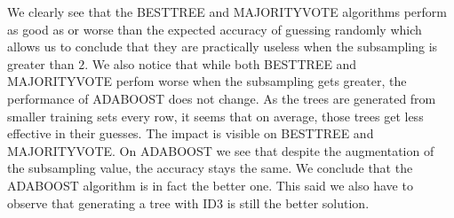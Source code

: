 \documentclass[9pt]{extarticle}
\begin{document}
	We clearly see that the BESTTREE and MAJORITYVOTE algorithms perform as good as or worse than the expected accuracy of guessing randomly which allows us to conclude that they are practically useless when the subsampling is greater than $2$.  We also notice that while both BESTTREE and MAJORITYVOTE perfom worse when the subsampling gets greater, the performance of ADABOOST does not change. As the trees are generated from smaller training sets every row, it seems that on average, those trees get less effective in their guesses. The impact is visible on BESTTREE and MAJORITYVOTE. On ADABOOST we see that despite the augmentation of the subsampling value, the accuracy stays the same. We conclude that the ADABOOST algorithm is in fact the better one. This said we also have to observe that generating a tree with ID3 is still the better solution.
\end{document}
